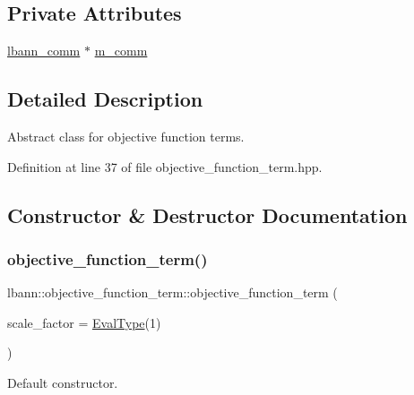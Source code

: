 \subsection*{Private Attributes}
\begin{DoxyCompactItemize}
\item 
\hyperlink{classlbann_1_1lbann__comm}{lbann\+\_\+comm} $\ast$ \hyperlink{classlbann_1_1objective__function__term_a591367c1f2eac887c0f7426335265345}{m\+\_\+comm}
\end{DoxyCompactItemize}


\subsection{Detailed Description}
Abstract class for objective function terms. 

Definition at line 37 of file objective\+\_\+function\+\_\+term.\+hpp.



\subsection{Constructor \& Destructor Documentation}
\mbox{\label{classlbann_1_1objective__function__term_a8c019e3c880f38dc20275e395acaeca1}} 
\subsubsection{\texorpdfstring{objective\+\_\+function\+\_\+term()}{objective\_function\_term()}\hspace{0.1cm}{\footnotesize\ttfamily [1/2]}}
{\footnotesize\ttfamily lbann\+::objective\+\_\+function\+\_\+term\+::objective\+\_\+function\+\_\+term (\begin{DoxyParamCaption}\item[{\hyperlink{base_8hpp_a3266f5ac18504bbadea983c109566867}{Eval\+Type}}]{scale\+\_\+factor = {\ttfamily \hyperlink{base_8hpp_a3266f5ac18504bbadea983c109566867}{Eval\+Type}(1)} }\end{DoxyParamCaption})}

Default constructor. 

